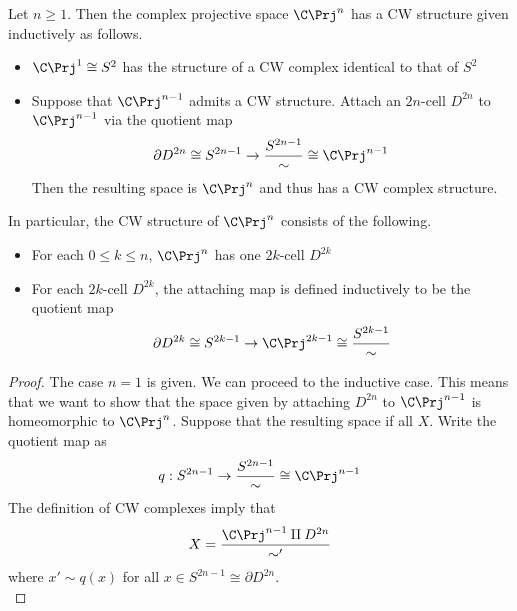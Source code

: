 \documentclass[a4paper]{article}
\begin{document}
\begin{prp}{}{} Let $n\geq 1$. Then the complex projective space $\C\Prj^n$ has a CW structure given inductively as follows. 
\begin{itemize}
\item $\C\Prj^1\cong S^2$ has the structure of a CW complex identical to that of $S^2$
\item Suppose that $\C\Prj^{n-1}$ admits a CW structure. Attach an $2n$-cell $D^{2n}$ to $\C\Prj^{n-1}$ via the quotient map $$\partial D^{2n}\cong S^{2n-1}\to\frac{S^{2n-1}}{\sim}\cong\C\Prj^{n-1}$$ Then the resulting space is $\C\Prj^n$ and thus has a CW complex structure. 
\end{itemize}
In particular, the CW structure of $\C\Prj^n$ consists of the following. 
\begin{itemize}
\item For each $0\leq k\leq n$, $\C\Prj^n$ has one $2k$-cell $D^{2k}$
\item For each $2k$-cell $D^{2k}$, the attaching map is defined inductively to be the quotient map $$\partial D^{2k}\cong S^{2k-1}\to\C\Prj^{2k-1}\cong\frac{S^{2k-1}}{\sim}$$
\end{itemize} 
\begin{proof}
The case $n=1$ is given. We can proceed to the inductive case. This means that we want to show that the space given by attaching $D^{2n}$ to $\C\Prj^{n-1}$ is homeomorphic to $\C\Prj^n$. Suppose that the resulting space if all $X$. Write the quotient map as $$q:S^{2n-1}\to\frac{S^{2n-1}}{\sim}\cong\C\Prj^{n-1}$$ The definition of CW complexes imply that $$X=\frac{\C\Prj^{n-1}\amalg D^{2n}}{\sim'}$$ where $x'\sim q(x)$ for all $x\in S^{2n-1}\cong\partial D^{2n}$. \\


\end{proof}
\end{prp}
\end{document}

